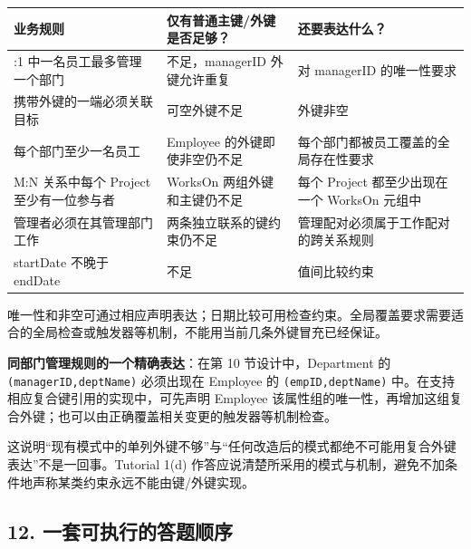 \begin{longtable}[]{@{}
  >{\raggedright\arraybackslash}p{}
  >{\raggedright\arraybackslash}p{}
  >{\raggedright\arraybackslash}p{}@{}}
\toprule\noalign{}
\begin{minipage}[b]{\linewidth}\raggedright
业务规则
\end{minipage} & \begin{minipage}[b]{\linewidth}\raggedright
仅有普通主键/外键是否足够？
\end{minipage} & \begin{minipage}[b]{\linewidth}\raggedright
还要表达什么？
\end{minipage} \\
\midrule\noalign{}
\endhead
\bottomrule\noalign{}
\endlastfoot
1:1 中一名员工最多管理一个部门 & 不足，managerID 外键允许重复 & 对 managerID 的唯一性要求 \\
携带外键的一端必须关联目标 & 可空外键不足 & 外键非空 \\
每个部门至少一名员工 & Employee 的外键即使非空仍不足 & 每个部门都被员工覆盖的全局存在性要求 \\
M:N 关系中每个 Project 至少有一位参与者 & WorksOn 两组外键和主键仍不足 & 每个 Project 都至少出现在一个 WorksOn 元组中 \\
管理者必须在其管理部门工作 & 两条独立联系的键约束仍不足 & 管理配对必须属于工作配对的跨关系规则 \\
startDate 不晚于 endDate & 不足 & 值间比较约束 \\
\end{longtable}

唯一性和非空可通过相应声明表达；日期比较可用检查约束。全局覆盖要求需要适合的全局检查或触发器等机制，不能用当前几条外键冒充已经保证。

\textbf{同部门管理规则的一个精确表达}：在第 10 节设计中，Department 的 \texttt{(\allowbreak{}managerID,\allowbreak{}deptName)\allowbreak{}} 必须出现在 Employee 的 \texttt{(\allowbreak{}empID,\allowbreak{}deptName)\allowbreak{}} 中。在支持相应复合键引用的实现中，可先声明 Employee 该属性组的唯一性，再增加这组复合外键；也可以由正确覆盖相关变更的触发器等机制检查。

这说明``现有模式中的单列外键不够''与``任何改造后的模式都绝不可能用复合外键表达''不是一回事。Tutorial 1(d) 作答应说清楚所采用的模式与机制，避免不加条件地声称某类约束永远不能由键/外键实现。

\subsection{12. 一套可执行的答题顺序}\label{04_er_to_relational_mapping_zh-ux4e00ux5957ux53efux6267ux884cux7684ux7b54ux9898ux987aux5e8f}

